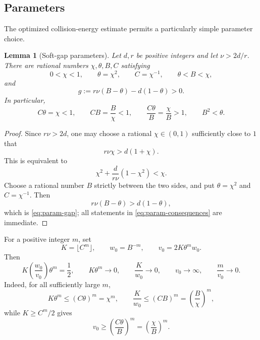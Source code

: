 \documentclass[11pt]{article}
\newtheorem{lemma}[theorem]{Lemma}
\theoremstyle{definition}
\theoremstyle{remark}
\numberwithin{equation}{section}
\begin{document}
\subsection{Parameters}

The optimized collision-energy estimate permits a particularly simple
parameter choice.

\begin{lemma}[Soft-gap parameters]\label{lem:parameters}
Let $d,r$ be positive integers and let $\nu>2d/r$.  There are rational
numbers $\chi,\theta,B,C$ satisfying
\begin{equation}\label{eq:param-soft}
 0<\chi<1,
 \qquad \theta=\chi^2,
 \qquad C=\chi^{-1},
 \qquad \theta<B<\chi,
\end{equation}
and
\begin{equation}\label{eq:param-gap}
 g:=r\nu(B-\theta)-d(1-\theta)>0.
\end{equation}
In particular,
\begin{equation}\label{eq:param-consequences}
 C\theta=\chi<1,
 \qquad CB=\frac B\chi<1,
 \qquad \frac{C\theta}{B}=\frac\chi B>1,
 \qquad B^2<\theta.
\end{equation}
\end{lemma}

\begin{proof}
Since $r\nu>2d$, one may choose a rational $\chi\in(0,1)$ sufficiently
close to $1$ that
\[
 r\nu\chi>d(1+\chi).
\]
This is equivalent to
\[
 \chi^2+\frac{d}{r\nu}(1-\chi^2)<\chi.
\]
Choose a rational number $B$ strictly between the two sides, and put
$\theta=\chi^2$ and $C=\chi^{-1}$.  Then
\[
 r\nu(B-\theta)>d(1-\theta),
\]
which is \eqref{eq:param-gap}; all statements in
\eqref{eq:param-consequences} are immediate.
\end{proof}

For a positive integer $m$, set
\begin{equation}\label{eq:dimension-parameters}
 K=\lfloor C^m\rfloor,
 \qquad w_0=B^{-m},
 \qquad v_0=2K\theta^m w_0.
\end{equation}
Then
\begin{equation}\label{eq:parameter-limits}
 K\left(\frac{w_0}{v_0}\right)\theta^m=\frac12,
 \qquad K\theta^m\longrightarrow0,
 \qquad \frac K{w_0}\longrightarrow0,
 \qquad v_0\longrightarrow\infty,
 \qquad \frac m{v_0}\longrightarrow0.
\end{equation}
Indeed, for all sufficiently large $m$,
\[
 K\theta^m\le(C\theta)^m=\chi^m,
 \qquad
 \frac K{w_0}\le(CB)^m=\left(\frac B\chi\right)^m,
\]
while $K\ge C^m/2$ gives
\[
 v_0\ge\left(\frac{C\theta}{B}\right)^m
      =\left(\frac\chi B\right)^m.
\]
\end{document}
